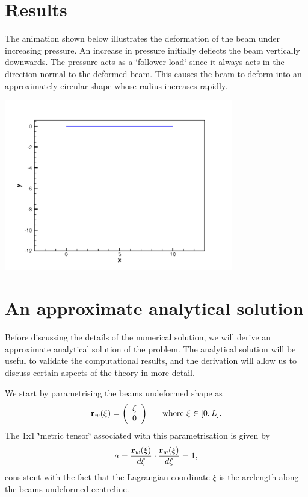 \hypertarget{index_results}{}\section{Results}\label{index_results}
The animation shown below illustrates the deformation of the beam under increasing pressure. An increase in pressure initially deflects the beam vertically downwards. The pressure acts as a \char`\"{}follower
load\char`\"{} since it always acts in the direction normal to the deformed beam. This causes the beam to deform into an approximately circular shape whose radius increases rapidly.

 
\begin{DoxyImage}
\includegraphics[width=0.75\textwidth]{string_animation}
\end{DoxyImage}




\hypertarget{index_approx}{}\section{An approximate analytical solution}\label{index_approx}
Before discussing the details of the numerical solution, we will derive an approximate analytical solution of the problem. The analytical solution will be useful to validate the computational results, and the derivation will allow us to discuss certain aspects of the theory in more detail.

We start by parametrising the beam\textquotesingle{}s undeformed shape as \[ {\bf r}_w(\xi) = \left( \begin{array}{c} \xi \\ 0 \end{array} \right) \mbox{ \ \ \ \ where $\xi \in [0,L].$} \] The 1x1 \char`\"{}metric tensor\char`\"{} associated with this parametrisation is given by \[ a = \frac{{\bf r}_w(\xi)}{d\xi} \cdot \frac{{\bf r}_w(\xi)}{d\xi} = 1, \] consistent with the fact that the Lagrangian coordinate $ \xi $ is the arclength along the beam\textquotesingle{}s undeformed centreline.

